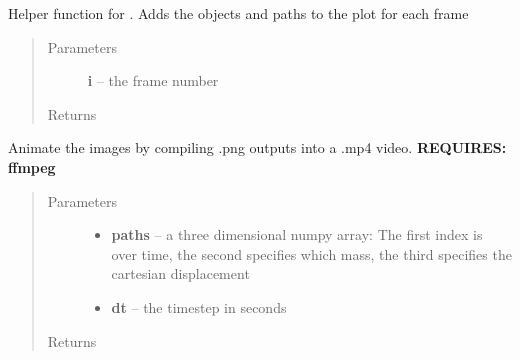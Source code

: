 \documentclass[letterpaper,10pt,english]{sphinxmanual}
\begin{document}
\label{index:module-plotting}

\begin{fulllineitems}
\label{index:plotting.animate}
Helper function for {\hyperref[index:plotting.animate_paths]{}}. Adds the objects and
paths to the plot for each frame
\begin{quote}\begin{description}
\item[{Parameters}] \leavevmode
\textbf{i} -- the frame number

\item[{Returns}] \leavevmode
{}

\end{description}\end{quote}

\end{fulllineitems}


\begin{fulllineitems}
\label{index:plotting.animate_paths}
Animate the images by compiling .png outputs into a .mp4 video. \textbf{REQUIRES: ffmpeg}
\begin{quote}\begin{description}
\item[{Parameters}] \leavevmode\begin{itemize}
\item {} 
\textbf{paths} -- a three dimensional numpy array: The first index is over time, the second specifies which mass, the third specifies the cartesian displacement

\item {} 
\textbf{dt} -- the timestep in seconds

\end{itemize}

\item[{Returns}] \leavevmode
{}

\end{description}\end{quote}

\end{fulllineitems}

\end{document}
